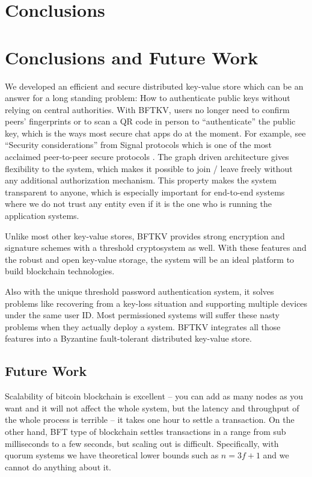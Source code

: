 \ifdefined\ABSTRACT
\section{Conclusions}
\else
\section{Conclusions and Future Work}
\fi
We developed an efficient and secure distributed key-value store which
can be an answer for a long standing problem: How to authenticate
public keys without relying on central authorities. With BFTKV,
users no longer need to confirm peers' fingerprints or to scan a QR
code in person to ``authenticate'' the public key, which is the ways
most secure chat apps do at the moment. For example, see ``Security
considerations'' from Signal protocols which is one of the most
acclaimed peer-to-peer secure protocols \cite{signal}.
The graph driven architecture gives flexibility to the system, which
makes it possible to join / leave freely without any additional
authorization mechanism. This property makes the system transparent to
anyone, which is especially important for end-to-end systems where we
do not trust any entity even if it is the one who is running the
application systems.

Unlike most other key-value stores, BFTKV provides strong encryption
and signature schemes with a threshold cryptosystem as well. With
these features and the robust and open key-value storage, the system
will be an ideal platform to build blockchain technologies.

Also with the unique threshold password authentication system, it
solves problems like recovering from a key-loss situation and
supporting multiple devices under the same user ID. Most permissioned
systems will suffer these nasty problems when they actually deploy a
system. BFTKV integrates all those features into a Byzantine
fault-tolerant distributed key-value store.

\ifdefined\ABSTRACT
\else
\subsection*{Future Work}
Scalability of bitcoin blockchain is excellent -- you can add as many
nodes as you want and it will not affect the whole system, but the
latency and throughput of the whole process is terrible -- it takes
one hour to settle a transaction.
On the other hand, BFT type of blockchain settles transactions in a
range from sub milliseconds to a few seconds, but scaling out is
difficult. Specifically, with quorum systems we have theoretical lower
bounds such as $n = 3f + 1$ and we cannot do anything about it.

